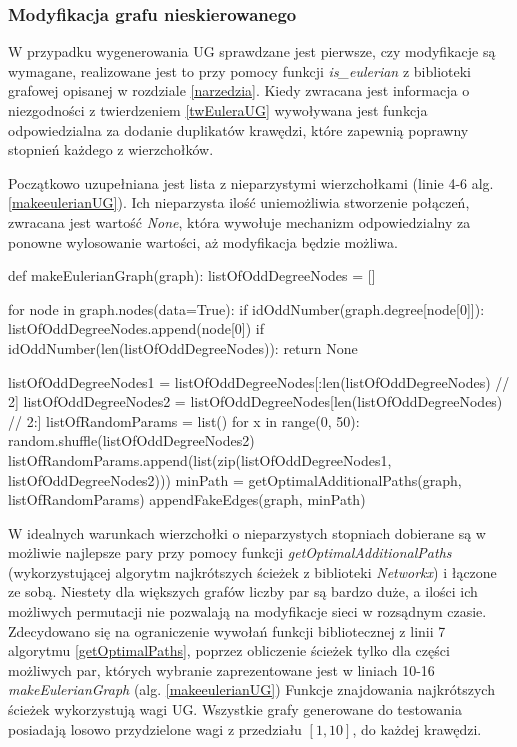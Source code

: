 \documentclass[a4paper, 12pt, twoside, openright]{article}
\begin{document}
\subsubsection{Modyfikacja grafu nieskierowanego} \label{mgnieskier}
	\indent\par	
	W przypadku wygenerowania UG sprawdzane jest pierwsze, czy modyfikacje są wymagane, realizowane jest to przy pomocy funkcji \textit{is\_eulerian} z biblioteki grafowej opisanej w rozdziale \ref{narzedzia}. Kiedy zwracana jest informacja o niezgodności z twierdzeniem \ref{twEuleraUG} wywoływana jest funkcja odpowiedzialna za dodanie duplikatów krawędzi, które zapewnią poprawny stopnień każdego z wierzchołków. 
	
	Początkowo uzupełniana jest lista z nieparzystymi wierzchołkami (linie 4-6 alg. \ref{makeeulerianUG}). Ich nieparzysta ilość uniemożliwia stworzenie połączeń, zwracana jest wartość \textit{None}, która wywołuje mechanizm odpowiedzialny za ponowne wylosowanie wartości, aż modyfikacja będzie możliwa.
	
\begin{algorithm}[caption={\textit{makeEulerianGraph} przekształcający graf nieskierowany do grafu Eulera}, label={makeeulerianUG}]
def makeEulerianGraph(graph):
	listOfOddDegreeNodes = []
	
	for node in graph.nodes(data=True):
		if idOddNumber(graph.degree[node[0]]):
			listOfOddDegreeNodes.append(node[0])
	if idOddNumber(len(listOfOddDegreeNodes)):
		return None
	
	listOfOddDegreeNodes1 = listOfOddDegreeNodes[:len(listOfOddDegreeNodes) // 2]
	listOfOddDegreeNodes2 = listOfOddDegreeNodes[len(listOfOddDegreeNodes) // 2:]
	listOfRandomParams = list()
	for x in range(0, 50):
		random.shuffle(listOfOddDegreeNodes2)
		listOfRandomParams.append(list(zip(listOfOddDegreeNodes1, 
							listOfOddDegreeNodes2)))
	minPath = getOptimalAdditionalPaths(graph, listOfRandomParams)
	appendFakeEdges(graph, minPath)
\end{algorithm}

	W idealnych warunkach wierzchołki o nieparzystych stopniach dobierane są w możliwie najlepsze pary przy pomocy funkcji \textit{getOptimalAdditionalPaths} (wykorzystującej algorytm najkrótszych ścieżek z biblioteki \textit{Networkx}) i łączone ze sobą. Niestety dla większych grafów liczby par są bardzo duże, a ilości ich możliwych permutacji nie pozwalają na modyfikacje sieci w rozsądnym czasie. Zdecydowano się na ograniczenie wywołań funkcji bibliotecznej z linii 7 algorytmu \ref{getOptimalPaths}, poprzez obliczenie ścieżek tylko dla części możliwych par, których wybranie zaprezentowane jest w liniach 10-16 \textit{makeEulerianGraph} (alg. \ref{makeeulerianUG}) Funkcje znajdowania najkrótszych ścieżek wykorzystują wagi UG. Wszystkie grafy generowane do testowania posiadają losowo przydzielone wagi z przedziału $[1, 10]$, do każdej krawędzi.
\end{document}
